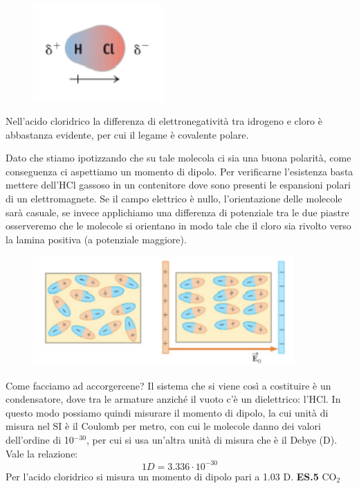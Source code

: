 \vspace{-0.4cm}\begin{figure}[htp]
    \centering
    \includegraphics[width=5cm]{immagini/HCl.png}
\end{figure}

\vspace{-0.4cm}Nell'acido cloridrico la differenza di elettronegatività tra idrogeno e cloro è abbastanza evidente, per cui il legame è covalente polare.

Dato che stiamo ipotizzando che su tale molecola ci sia una buona polarità, come conseguenza ci aspettiamo un momento di dipolo.
Per verificarne l'esistenza basta mettere dell'HCl gassoso in un contenitore dove sono presenti le espansioni polari di un elettromagnete. Se il campo elettrico è nullo, l'orientazione delle molecole sarà casuale, se invece applichiamo una differenza di potenziale tra le due piastre osserveremo che le molecole si orientano in modo tale che il cloro sia rivolto verso la lamina positiva (a potenziale maggiore).
\begin{figure}[htp]
    \centering
    \includegraphics[width=10cm]{immagini/condensatore.png}
\end{figure}
Come facciamo ad accorgercene?
Il sistema che si viene così a costituire è un condensatore, dove tra le armature anziché il vuoto c'è un dielettrico: l'HCl. In questo modo possiamo quindi misurare il momento di dipolo, la cui unità di misura nel SI è il Coulomb per metro, con cui le molecole danno dei valori dell'ordine di 10$^{-30}$, per cui si usa un'altra unità di misura che è il Debye (D). Vale la relazione:
$$1D=3.336\cdot10^{-30}$$
Per l'acido cloridrico si misura un momento di dipolo pari a 1.03 D.
\newpage
\vspace{0.2cm}\textbf{ES.5} CO$_2$

